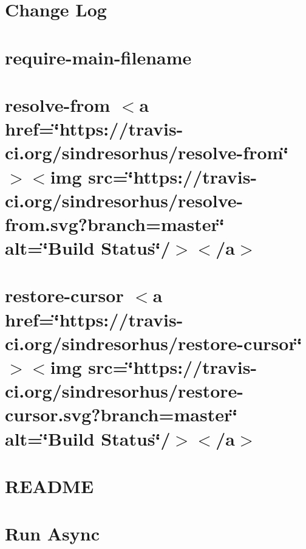 \let\mypdfximage\pdfximage\def\pdfximage{\immediate\mypdfximage}\documentclass[twoside]{book}
\newcommand{\+}{\discretionary{\mbox{\scriptsize$\hookleftarrow$}}{}{}}
\begin{document}
\chapter{Change Log}
\label{md_heap-visualizer_node_modules_require-main-filename__c_h_a_n_g_e_l_o_g}

\chapter{require-\/main-\/filename}
\label{md_heap-visualizer_node_modules_require-main-filename__r_e_a_d_m_e}

\chapter{resolve-\/from $<$a href=\char`\"{}https\+://travis-\/ci.\+org/sindresorhus/resolve-\/from\char`\"{}$>$$<$img src=\char`\"{}https\+://travis-\/ci.\+org/sindresorhus/resolve-\/from.\+svg?branch=master\char`\"{} alt=\char`\"{}\+Build Status\char`\"{}/$>$$<$/a$>$}
\label{md_heap-visualizer_node_modules_resolve-from_readme}

\chapter{restore-\/cursor $<$a href=\char`\"{}https\+://travis-\/ci.\+org/sindresorhus/restore-\/cursor\char`\"{}$>$$<$img src=\char`\"{}https\+://travis-\/ci.\+org/sindresorhus/restore-\/cursor.\+svg?branch=master\char`\"{} alt=\char`\"{}\+Build Status\char`\"{}/$>$$<$/a$>$}
\label{md_heap-visualizer_node_modules_restore-cursor_readme}

\chapter{R\+E\+A\+D\+ME}
\label{md_heap-visualizer_node_modules_rimraf__r_e_a_d_m_e}

\chapter{Run Async}
\label{md_heap-visualizer_node_modules_run-async__r_e_a_d_m_e}

\end{document}
